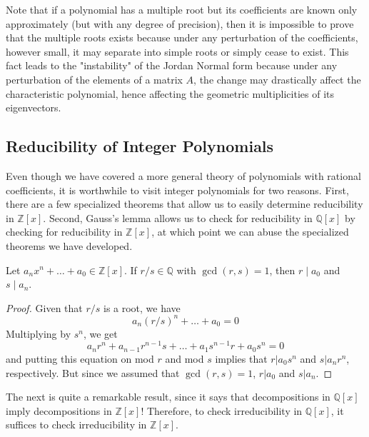   Note that if a polynomial has a multiple root but its coefficients are known only approximately (but with any degree of precision), then it is impossible to prove that the multiple roots exists because under any perturbation of the coefficients, however small, it may separate into simple roots or simply cease to exist. This fact leads to the "instability" of the Jordan Normal form because under any perturbation of the elements of a matrix $A$, the change may drastically affect the characteristic polynomial, hence affecting the geometric multiplicities of its eigenvectors. 

\subsection{Reducibility of Integer Polynomials} 

  Even though we have covered a more general theory of polynomials with rational coefficients, it is worthwhile to visit integer polynomials for two reasons. First, there are a few specialized theorems that allow us to easily determine reducibility in $\mathbb{Z}[x]$. Second, Gauss's lemma allows us to check for reducibility in $\mathbb{Q}[x]$ by checking for reducibility in $\mathbb{Z}[x]$, at which point we can abuse the specialized theorems we have developed. 

  \begin{theorem}
    Let $a_n x^n + \ldots + a_0 \in \mathbb{Z}[x]$. If $r/s \in \mathbb{Q}$ with $\gcd(r, s) = 1$, then $r \mid a_0$ and $s \mid a_n$. 
  \end{theorem}
  \begin{proof}
    Given that $r/s$ is a root, we have 
    \begin{equation}
      a_n (r/s)^n + \ldots + a_0 = 0
    \end{equation}
    Multiplying by $s^n$, we get 
    \begin{equation}
      a_n r^n + a_{n-1} r^{n-1} s + \ldots + a_1 s^{n-1} r + a_0 s^n = 0
    \end{equation}
    and putting this equation on mod $r$ and mod $s$ implies that $r | a_0 s^n$ and $s | a_n r^n$, respectively. But since we assumed that $\gcd (r, s) = 1$, $r | a_0$ and $s | a_n$. 
  \end{proof}

  The next is quite a remarkable result, since it says that decompositions in $\mathbb{Q}[x]$ imply decompositions in $\mathbb{Z}[x]$! Therefore, to check irreducibility in $\mathbb{Q}[x]$, it suffices to check irreducibility in $\mathbb{Z}[x]$. 

